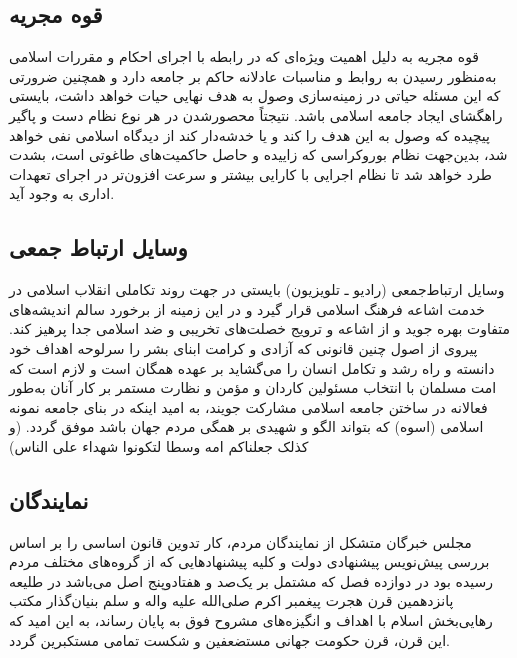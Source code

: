 \documentclass[12pt]{article}
\begin{document}
\subsection*{قوه مجریه‌}
قوه مجریه به دلیل اهمیت ویژه‌ای که در رابطه با اجرای احکام و مقررات اسلامی به‌منظور رسیدن به روابط و مناسبات عادلانه حاکم بر جامعه دارد و همچنین ضرورتی که این مسئله حیاتی در زمینه‌سازی وصول به هدف نهایی حیات خواهد داشت، بایستی راهگشای ایجاد جامعه اسلامی باشد. نتیجتاً محصورشدن در هر نوع نظام دست و پاگیر پیچیده که وصول به این هدف را کند و یا خدشه‌دار کند از دیدگاه اسلامی نفی خواهد شد، بدین‌جهت نظام ‌بوروکراسی که زاییده و حاصل حاکمیت‌های طاغوتی است‌، بشدت طرد خواهد شد تا نظام اجرایی با کارایی بیشتر و سرعت افزون‌تر در اجرای تعهدات اداری به وجود آید.

\subsection*{وسایل ارتباط جمعی}
‌وسایل ارتباط‌جمعی (رادیو ـ تلویزیون‌) بایستی در جهت روند تکاملی انقلاب اسلامی در خدمت اشاعه فرهنگ اسلامی قرار گیرد و در این زمینه از برخورد سالم اندیشه‌های متفاوت بهره جوید و از اشاعه و ترویج خصلت‌های تخریبی و ضد اسلامی جدا پرهیز کند. پیروی از اصول چنین قانونی که آزادی و کرامت ابنای بشر را سرلوحه اهداف خود دانسته و راه رشد و تکامل انسان را می‌گشاید بر عهده همگان است و لازم است که امت مسلمان با انتخاب‌ مسئولین کاردان و مؤمن و نظارت مستمر بر کار آنان به‌طور فعالانه در ساختن جامعه اسلامی مشارکت جویند، به امید اینکه در بنای جامعه نمونه اسلامی (اسوه‌) که بتواند الگو و شهیدی بر همگی مردم جهان باشد موفق گردد. (و کذلک جعلناکم امه وسطا لتکونوا شهداء علی الناس)

\subsection*{نمایندگان‌}
مجلس خبرگان متشکل از نمایندگان مردم‌، کار تدوین قانون اساسی را بر اساس بررسی پیش‌نویس پیشنهادی دولت و کلیه پیشنهادهایی که از گروه‌های مختلف مردم رسیده بود در دوازده فصل که مشتمل بر یک‌صد و هفتادوپنج اصل می‌باشد در طلیعه پانزدهمین قرن هجرت پیغمبر اکرم صلی‌الله علیه واله و سلم بنیان‌گذار مکتب رهایی‌بخش اسلام با اهداف و انگیزه‌های مشروح فوق به پایان رساند، به این امید که این قرن‌، قرن حکومت‌ جهانی مستضعفین و شکست ‌تمامی مستکبرین گردد.
\end{document}
